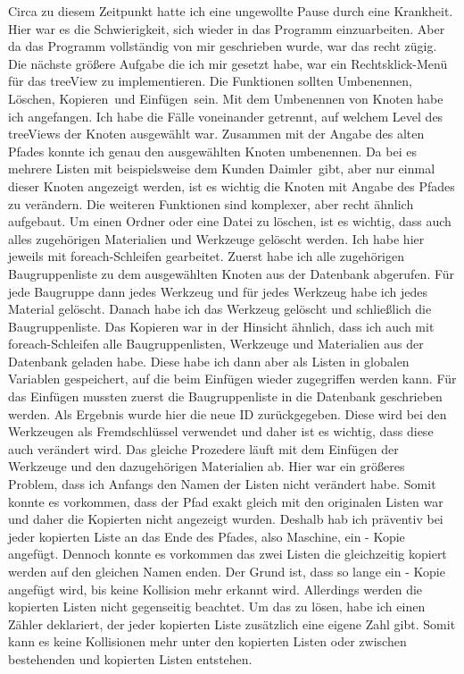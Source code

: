 \documentclass{Vorlage}
\begin{document}
Circa zu diesem Zeitpunkt hatte ich eine ungewollte Pause durch eine Krankheit. Hier war es die Schwierigkeit,
sich wieder in das Programm einzuarbeiten. Aber da das Programm vollständig von mir geschrieben wurde, war 
das recht zügig. Die nächste größere Aufgabe die ich mir gesetzt habe, war ein Rechtsklick-Menü für das 
treeView zu implementieren. Die Funktionen sollten \glqq Umbenennen\grqq , \glqq Löschen\grqq , 
\glqq Kopieren\grqq \, und \glqq Einfügen\grqq \, sein. 
Mit dem Umbenennen von Knoten habe ich angefangen. Ich habe die Fälle voneinander getrennt, auf welchem Level 
des treeViews der Knoten ausgewählt war. Zusammen mit der Angabe des alten Pfades konnte ich genau den 
ausgewählten Knoten umbenennen. 
Da bei es mehrere Listen mit beispielsweise dem Kunden \glqq Daimler\grqq \, gibt, 
aber nur 
einmal dieser Knoten angezeigt werden, ist es wichtig die Knoten mit Angabe des Pfades zu verändern. Die 
weiteren Funktionen sind komplexer, aber recht ähnlich aufgebaut. Um einen Ordner oder eine Datei zu löschen, 
ist es wichtig, dass auch alles zugehörigen Materialien und Werkzeuge gelöscht werden. Ich habe hier 
jeweils mit foreach-Schleifen gearbeitet. Zuerst habe ich alle zugehörigen Baugruppenliste zu dem ausgewählten 
Knoten aus der Datenbank abgerufen. Für jede Baugruppe dann jedes Werkzeug und für jedes Werkzeug habe ich
jedes Material gelöscht. Danach habe ich das Werkzeug gelöscht und schließlich die Baugruppenliste. 
Das Kopieren war in der Hinsicht ähnlich, dass ich auch mit foreach-Schleifen alle Baugruppenlisten, 
Werkzeuge und Materialien aus der Datenbank geladen habe. Diese habe ich dann aber als Listen in globalen 
Variablen gespeichert, auf die beim Einfügen wieder zugegriffen werden kann. Für das Einfügen mussten zuerst 
die Baugruppenliste in die Datenbank geschrieben werden. Als Ergebnis wurde hier die neue ID zurückgegeben.
Diese wird bei den 
Werkzeugen als Fremdschlüssel verwendet und daher ist es wichtig, dass diese auch verändert wird. Das gleiche 
Prozedere läuft mit dem Einfügen der Werkzeuge und den dazugehörigen Materialien ab. Hier war ein größeres 
Problem, dass ich Anfangs den Namen der Listen nicht verändert habe. Somit konnte es vorkommen, dass der Pfad 
exakt gleich mit den originalen Listen war und daher die Kopierten nicht angezeigt wurden. Deshalb hab ich
präventiv bei jeder kopierten Liste an das Ende des Pfades, also Maschine, ein \glqq- Kopie\grqq \, angefügt. 
Dennoch
konnte es vorkommen das zwei Listen die gleichzeitig kopiert werden auf den gleichen Namen enden. Der 
Grund ist, dass so lange ein \glqq- Kopie\grqq \, angefügt wird, bis keine Kollision mehr erkannt wird. 
Allerdings
werden die kopierten Listen nicht gegenseitig beachtet. Um das zu lösen, habe ich einen Zähler deklariert, der
jeder kopierten Liste zusätzlich eine eigene Zahl gibt. Somit kann es keine Kollisionen mehr unter den 
kopierten Listen oder zwischen bestehenden und kopierten Listen entstehen.
\end{document}

